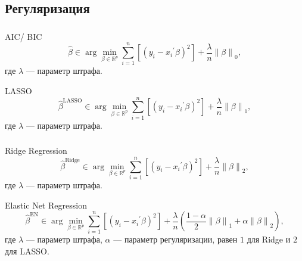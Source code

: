 \documentclass[c, dvipsnames]{beamer}  %
\begin{document}
\subsection{Регуляризация}



\begin{frame}
\frametitle{\insertsection} 
\framesubtitle{\insertsubsection}
 \begin{block}{AIC/ BIC}
  \begin{equation}
  \hat{\beta}  \in \arg \min_{\beta \in
\mathbb{R}^p} \sum_{i=1}^n \left[ (y_i - {x_i}^{'} \beta)^2 \right] +  \frac{\lambda}{n} \left\lVert \beta \right\rVert_0, 
\end{equation}
где $\lambda$ --- параметр штрафа.
 \end{block}

 \begin{block}{LASSO}
  \begin{equation}
  \hat{\beta}^{\text{LASSO}} \in \arg \min_{\beta \in
\mathbb{R}^p} \sum_{i=1}^n \left[ (y_i - {x_i}^{'} \beta)^2 \right] +  \frac{\lambda}{n} \left\lVert \beta \right\rVert_1,
\end{equation}
где $\lambda$ --- параметр штрафа.
 \end{block}
 
  \end{frame}
 \begin{frame}
 \frametitle{\insertsection} 
\framesubtitle{\insertsubsection}

 \begin{block}{Ridge Regression}
  \begin{equation}
  \hat{\beta}^{\text{Ridge}} \in \arg \min_{\beta \in
\mathbb{R}^p} \sum_{i=1}^n \left[ (y_i - {x_i}^{'} \beta)^2 \right] +  \frac{\lambda}{n} \left\lVert \beta \right\rVert_2,
\end{equation}
где $\lambda$ --- параметр штрафа.
 \end{block}

 \begin{block}{Elastic Net Regression}
  \begin{equation}
  \hat{\beta}^{\text{EN}} \in \arg \min_{\beta \in
\mathbb{R}^p} \sum_{i=1}^n \left[ (y_i - {x_i}^{'} \beta)^2 \right] +  \frac{\lambda}{n}
\left( \frac{1 - \alpha}{2} \left\lVert \beta \right\rVert_1 + 
\alpha \left\lVert \beta \right\rVert_2 \right),
\end{equation}
где $\lambda$ --- параметр штрафа,
$\alpha$ --- параметр регуляризации, равен $1$ для Ridge и
$2$ для LASSO.
\end{block}
 
 
\end{frame}
\end{document}
